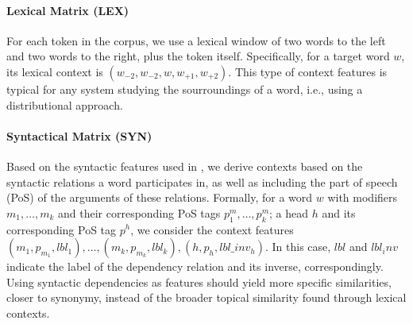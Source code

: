 \documentclass[11pt]{article}
\begin{document}
\paragraph{Lexical Matrix (LEX)}
For each token in the corpus, we use a lexical window of two words to the left and two words to the right, plus the token itself. Specifically, for a target word $w$, its lexical context is $(w_{-2}, w_{-2}, w, w_{+1}, w_{+2})$. This type of context features is typical for any system studying the sourroundings of a word, i.e., using a distributional approach.

\paragraph{Syntactical Matrix (SYN)}
Based on the syntactic features used in   \cite{LevyG14,Panchenko2017}, we derive contexts based on the syntactic relations a word participates in, as well as including the part of speech (PoS) of the arguments of these relations. Formally, for a word $w$ with modifiers $m_1, \dots, m_k$ and their corresponding PoS tags $p^m_1, \dots, p^m_k$; a head $h$ and its corresponding PoS tag $p^h$, we consider the context features $(m_1, p_{m_1}, lbl_1), \dots, (m_k, p_{m_k}, lbl_k), \allowbreak (h,p_h,lbl\_inv_h)$. In this case, $lbl$ and $lbl_inv$ indicate the label of the dependency relation and its inverse, correspondingly. Using syntactic dependencies as features should yield more specific similarities, closer to synonymy, instead of the broader topical similarity found through lexical contexts.
\end{document}
